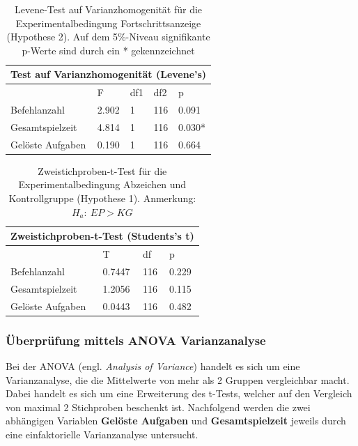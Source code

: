 \begin{table}[htbp]
\centering
\begin{tabular}{ |p{4cm}||p{2.0cm}|p{2.0cm}|p{2.0cm}|p{2.0cm}| }
 \hline
 \multicolumn{5}{|c|}{Test auf Varianzhomogenität (Levene's)} \\
 \hline
 & F & df1 &df2 &p \\
 \hline
  Befehlanzahl      & 2.902     & 1 &   116 & 0.091\\
  Gesamtspielzeit   & 4.814     & 1 &   116 & 0.030*\\
  Gelöste Aufgaben  & 0.190     & 1 &   116 & 0.664\\
 \hline
\end{tabular}
\caption{Levene-Test auf Varianzhomogenität für die Experimentalbedingung Fortschrittsanzeige (Hypothese 2). Auf dem 5\%-Niveau signifikante p-Werte sind durch ein * gekennzeichnet}
\label{levene_hypo_2}
\end{table}
\begin{table}[htbp]
\centering
\begin{tabular}{ |p{4cm}||p{2.0cm}|p{2.0cm}|p{2.0cm}| }
 \hline
 \multicolumn{4}{|c|}{Zweistichproben-t-Test (Students's t)} \\
 \hline
 & T &df & p \\
 \hline
  Befehlanzahl       & 0.7447   &   116 & 0.229\\
  Gesamtspielzeit    & 1.2056   &   116 & 0.115\\
  Gelöste Aufgaben   & 0.0443   &   116 & 0.482\\
 \hline
\end{tabular}
\caption{Zweistichproben-t-Test für die Experimentalbedingung Abzeichen und Kontrollgruppe (Hypothese 1). Anmerkung: $H_a:\: EP > KG$}
\label{ttest_hypo_2}
\end{table}

\subsubsection{Überprüfung mittels ANOVA Varianzanalyse }
Bei der ANOVA (engl. \textit{Analysis of Variance}) handelt es sich um eine Varianzanalyse, die die Mittelwerte von mehr als 2 Gruppen vergleichbar macht. Dabei handelt es sich um eine Erweiterung des t-Tests, welcher auf den Vergleich von maximal 2 Stichproben beschenkt ist. Nachfolgend werden die zwei abhängigen Variablen \textbf{Gelöste Aufgaben} und \textbf{Gesamtspielzeit} jeweils durch eine einfaktorielle Varianzanalyse untersucht.

